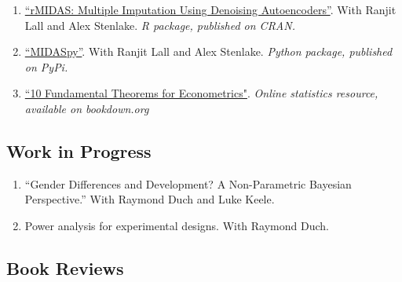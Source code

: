 \documentclass[11pt, a4paper]{article}
\begin{document}
\begin{enumerate}

  \item \href{https://CRAN.R-project.org/package=rMIDAS}{``rMIDAS: Multiple Imputation Using Denoising Autoencoders''}. With Ranjit Lall and Alex Stenlake. \textit{R package, published on CRAN.}

  \item \href{https://pypi.org/project/MIDASpy/}{``MIDASpy''}. With Ranjit Lall and Alex Stenlake. \textit{Python package, published on PyPi.}

  \item \href{https://bookdown.org/ts_robinson1994/10_fundamental_theorems_for_econometrics/vtDma6bZJ/}{``10 Fundamental Theorems for Econometrics"}. \textit{Online statistics resource, available on bookdown.org}

\end{enumerate}


\subsection*{Work in Progress}

\begin{enumerate}
\item ``Gender Differences and Development? A Non-Parametric Bayesian Perspective.'' With Raymond Duch and Luke Keele. 

\item Power analysis for experimental designs.  With Raymond Duch.
\end{enumerate}

 \subsection*{Book Reviews}
\end{document}

